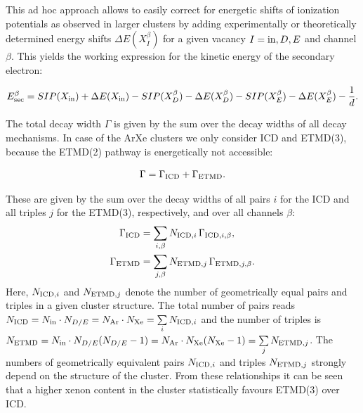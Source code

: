 This {\latin ad hoc} approach allows to easily correct for energetic shifts of ionization potentials as observed in larger clusters by adding experimentally or theoretically determined energy shifts $\Delta E(X_{I}^{\beta})$ for a given vacancy $I={\rm in},D,E$ and channel $\beta$. This yields the working expression for the kinetic energy of the secondary electron:

\begin{equation}
 E_{\rm sec}^\beta = SIP(X_{\rm in}) + \Delta E (X_{\rm in})
               - SIP(X_{D}^\beta) - \Delta E (X_{D}^\beta)
               - SIP(X_{E}^\beta) - \Delta E (X_{E}^\beta)
               - \frac 1d .
\end{equation}

The total decay width $\Gamma$ is given by the sum over the decay widths
of all decay mechanisms. In case of the ArXe clusters we only consider
ICD and ETMD(3), because the ETMD(2) pathway is energetically not accessible:

\begin{equation}
 \Gamma = \Gamma_{\rm ICD} + \Gamma_{\rm ETMD} .
\end{equation}

These are given by the sum over the decay widths of all pairs $i$ for the
ICD and all triples $j$ for the ETMD(3), respectively, and over all channels $\beta$:
%
\begin{align}
 \Gamma_{\rm ICD}  &= \sum\limits_{i,\beta} N_{{\rm ICD},i}  \, \Gamma_{{\rm ICD},i,\beta},\\
 \Gamma_{\rm ETMD} &= \sum\limits_{j,\beta} N_{{\rm ETMD},j} \, \Gamma_{{\rm ETMD},j,\beta}.
\end{align}
Here, $N_{{\rm ICD},i}$ and $N_{{\rm ETMD},j}$ denote the number of geometrically
equal pairs and triples in a given cluster structure. The total number of pairs
reads
$N_{{\rm ICD}} = N_{\rm in} \cdot N_{D/E} = N_{\rm Ar} \cdot N_{\rm Xe}
 = \sum\limits_i N_{{\rm ICD},i}$ and the number of triples is
$N_{{\rm ETMD}} = N_{\rm in} \cdot N_{D/E} (N_{D/E} - 1) = N_{\rm Ar} \cdot N_{\rm Xe} (N_{\rm Xe} - 1)
 = \sum\limits_j N_{{\rm ETMD},j}$.
The numbers of geometrically equivalent pairs $N_{{\rm ICD},i}$ and triples $N_{{\rm ETMD},j}$
strongly depend on the structure of the cluster. From these relationships
it can be seen that a higher xenon content in the cluster statistically
favours ETMD(3) over ICD.

